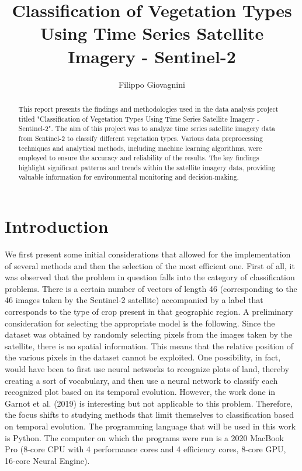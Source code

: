 \documentclass{article}
\title{Classification of Vegetation Types Using Time Series Satellite Imagery - Sentinel-2}
\author{Filippo Giovagnini}
\begin{document}
\maketitle

\begin{abstract}
    This report presents the findings and methodologies used in the data analysis project titled "Classification of Vegetation Types Using Time Series Satellite Imagery - Sentinel-2". The aim of this project was to analyze time series satellite imagery data from Sentinel-2 to classify different vegetation types. Various data preprocessing techniques and analytical methods, including machine learning algorithms, were employed to ensure the accuracy and reliability of the results. The key findings highlight significant patterns and trends within the satellite imagery data, providing valuable information for environmental monitoring and decision-making.
\end{abstract}

\section{Introduction}
\label{sec:intro}
We first present some initial considerations that allowed for the implementation of several methods and then the selection of the most efficient one. First of all, it was observed that the problem in question falls into the category of classification problems. There is a certain number of vectors of length 46 (corresponding to the 46 images taken by the Sentinel-2 satellite) accompanied by a label that corresponds to the type of crop present in that geographic region. A preliminary consideration for selecting the appropriate model is the following. Since the dataset was obtained by randomly selecting pixels from the images taken by the satellite, there is no spatial information. This means that the relative position of the various pixels in the dataset cannot be exploited. One possibility, in fact, would have been to first use neural networks to recognize plots of land, thereby creating a sort of vocabulary, and then use a neural network to classify each recognized plot based on its temporal evolution. However, the work done in Garnot et al. (2019) is interesting but not applicable to this problem. Therefore, the focus shifts to studying methods that limit themselves to classification based on temporal evolution. The programming language that will be used in this work is Python. The computer on which the programs were run is a 2020 MacBook Pro (8-core CPU with 4 performance cores and 4 efficiency cores, 8-core GPU, 16-core Neural Engine).
\end{document}
